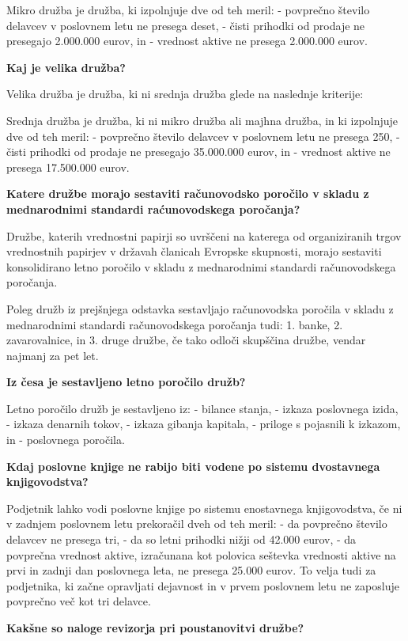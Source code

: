 \documentclass[a4paper,12pt,openright]{book}
\begin{document}
Mikro družba je družba, ki izpolnjuje dve od teh meril:
- povprečno število delavcev v poslovnem letu ne presega deset,
- čisti prihodki od prodaje ne presegajo 2.000.000 eurov, in
- vrednost aktive ne presega 2.000.000 eurov.

\textbf{Kaj je velika družba?}

Velika družba je družba, ki ni srednja družba glede na naslednje kriterije:

Srednja družba je družba, ki ni mikro družba ali majhna družba, in ki izpolnjuje dve od teh meril:
- povprečno število delavcev v poslovnem letu ne presega 250,
- čisti prihodki od prodaje ne presegajo 35.000.000 eurov, in
- vrednost aktive ne presega 17.500.000 eurov.

\textbf{Katere družbe morajo sestaviti računovodsko poročilo v skladu z mednarodnimi standardi raćunovodskega poročanja?}

Družbe, katerih vrednostni papirji so uvrščeni na katerega od organiziranih trgov vrednostnih papirjev v državah članicah Evropske skupnosti, morajo sestaviti konsolidirano letno poročilo v skladu z mednarodnimi standardi računovodskega poročanja.

Poleg družb iz prejšnjega odstavka sestavljajo računovodska poročila v skladu z mednarodnimi standardi računovodskega poročanja tudi:
1. banke,
2. zavarovalnice, in
3. druge družbe, če tako odloči skupščina družbe, vendar najmanj za pet let.

\textbf{Iz česa je sestavljeno letno poročilo družb?}

Letno poročilo družb je sestavljeno iz:
- bilance stanja,
- izkaza poslovnega izida,
- izkaza denarnih tokov,
- izkaza gibanja kapitala,
- priloge s pojasnili k izkazom, in
- poslovnega poročila.

\textbf{Kdaj poslovne knjige ne rabijo biti vodene po sistemu dvostavnega knjigovodstva?}

Podjetnik lahko vodi poslovne knjige po sistemu enostavnega knjigovodstva, če ni v zadnjem poslovnem letu prekoračil dveh od teh meril:
- da povprečno število delavcev ne presega tri,
- da so letni prihodki nižji od 42.000 eurov,
- da povprečna vrednost aktive, izračunana kot polovica seštevka vrednosti aktive na prvi in zadnji dan poslovnega leta, ne presega 25.000 eurov. To velja tudi za podjetnika, ki začne opravljati dejavnost in v prvem poslovnem letu ne zaposluje povprečno več kot tri delavce.

\textbf{Kakšne so naloge revizorja pri poustanovitvi družbe?}
\end{document}
